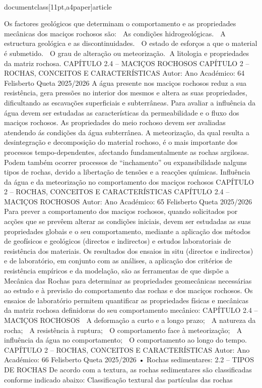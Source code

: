 \\documentclass[11pt,a4paper]{article}
\begin{document}
Os factores geológicos que determinam o comportamento e as propriedades mecânicas dos 
maciços rochosos são:
 As condições hidrogeológicas.
 A estructura geológica e as discontinuidades.
 O estado de esforços a que o material é submetido.
 O grau de alteração ou meteorização. A litologia e propriedades da matriz rochosa.
CAPÍTULO 2.4 – MACIÇOS ROCHOSOS 
CAPÍTULO 2 
–
 ROCHAS, CONCEITOS E CARACTERÍSTICAS
Autor:
Ano Académico:
64
Felisberto Queta
2025/2026
A água presente nos maciços rochosos reduz a sua resistência, gera pressões no interior dos
mesmos e altera as suas propriedades, dificultando as escavações superficiais e subterrâneas. Para
avaliar a influência da água devem ser estudadas as características da permeabilidade e o fluxo dos
maciços rochosos.
As propriedades do meio rochoso devem ser avaliadas atendendo ás condições da água subterrânea.
A meteorização, da qual resulta a desintegração e decomposição do material rochoso, é o mais
importante dos processos tempo-dependentes, afectando fundamentalmente as rochas argilosas.
Podem também ocorrer processos de “inchamento” ou expansibilidade nalguns tipos de rochas,
devido a libertação de tensões e a reacções químicas.
Influência da água e da meteorização no comportamento dos maciços rochosos
CAPÍTULO 2 
–
 ROCHAS, CONCEITOS E CARACTERÍSTICAS
CAPÍTULO 2.4 – MACIÇOS ROCHOSOS 
Autor:
Ano Académico:
65
Felisberto Queta
2025/2026
Para prever a comportamento dos maciços rochosos, quando solicitados por acções que se 
prevêem alterar as condições iniciais, devem ser estudadas as suas propriedades globais e o seu 
comportamento, mediante a aplicação dos métodos de geofísicos e geológicos (directos e 
indirectos) e estudos laboratoriais de resistência dos materiais.
Os resultados dos ensaios in situ (directos e indirectos) e de laboratório, em conjunto com as 
análises, a aplicação dos critérios de resistência empíricos e da modelação, são as ferramentas de 
que dispõe a Mecânica das Rochas para determinar as propriedades geomecânicas necessárias ao 
estudo e à previsão do comportamento das rochas e dos maciços rochosos.
Os ensaios de laboratório permitem quantificar as propriedades físicas e mecânicas da
matriz rochosa definidoras do seu comportamento mecânico:
CAPÍTULO 2.4 – MACIÇOS ROCHOSOS 
 A deformação a curto e a longo prazo;
 A natureza da rocha;
 A resistência à ruptura;
 O comportamento face à meteorização;
 A influência da água no comportamento;
 O comportamento ao longo do tempo.
CAPÍTULO 2 
–
 ROCHAS, CONCEITOS E CARACTERÍSTICAS
Autor:
Ano Académico:
66
Felisberto Queta
2025/2026
• Rochas sedimentares: 
2.2 – TIPOS DE ROCHAS
De acordo com a textura, as rochas sedimentares são classificadas conforme indicado abaixo:
Classificação textural das partículas das rochas\
\end{document}
